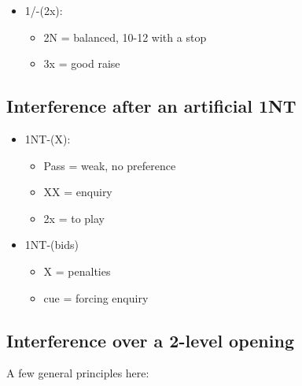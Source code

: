 \documentclass[a4paper,14pt]{extarticle}
\begin{document}
\begin{itemize}
\item 1\hearts/\spades-(2x):
	\begin{itemize}
	\item 2N = balanced, 10-12 with a stop
	\item 3x = good raise
	\end{itemize}
	 
\end{itemize}

\subsection{Interference after an artificial 1NT}
\label{sec:intf:1N}

\begin{itemize}
\item 1NT-(X):
	\begin{itemize}
	\item Pass = weak, no preference
	\item XX = enquiry
	\item 2x = to play
	\end{itemize}
\item 1NT-(bids)
	\begin{itemize}
	\item X = penalties
	\item cue = forcing enquiry
	\end{itemize}
\end{itemize}


\subsection{Interference over a 2-level opening}
\label{sec:intf:2level}

A few general principles here:
\end{document}
